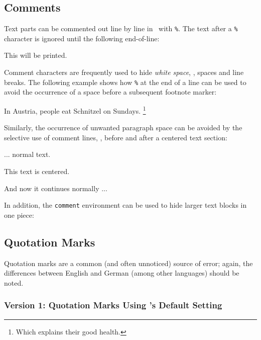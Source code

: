 \subsection{Comments}
\label{sec:comments}

Text parts can be commented out line by line in \latex\ with \verb!%!. The text
after a \verb!%! character is ignored until the following end-of-line:
%
\begin{LaTeXCode}[numbers=none]
This will be printed. %
\end{LaTeXCode}
%
Comment characters are frequently used to hide \emph{white space}, \ie, spaces
and line breaks. The following example shows how \verb!%! at the end of a line
can be used to avoid the occurrence of a space before a subsequent footnote
marker:
%
\begin{LaTeXCode}[numbers=none]
In Austria, people eat Schnitzel on Sundays.%
\footnote{Which explains their good health.}
\end{LaTeXCode}
%
Similarly, the occurrence of unwanted paragraph space can be avoided by the
selective use of comment lines, \eg, before and after a centered text section:
%
\begin{LaTeXCode}[numbers=none]
... normal text.
%
\begin{center}
   This text is centered.
\end{center}
%
And now it continues normally ...
\end{LaTeXCode}
%
In addition, the \verb!comment! environment can be used to hide larger text blocks
in one piece:
\begin{LaTeXCode}[numbers=none]
\begin{comment}
This text ...
   ... is ignored.
\end{comment}
\end{LaTeXCode}



\subsection{Quotation Marks}
\label{sec:quotation-marks}

Quotation marks are a common (and often unnoticed) source of error; again, the
differences between English and German (among other languages) should be noted.

\subsubsection{Version 1: Quotation Marks Using \latex's Default Setting}

